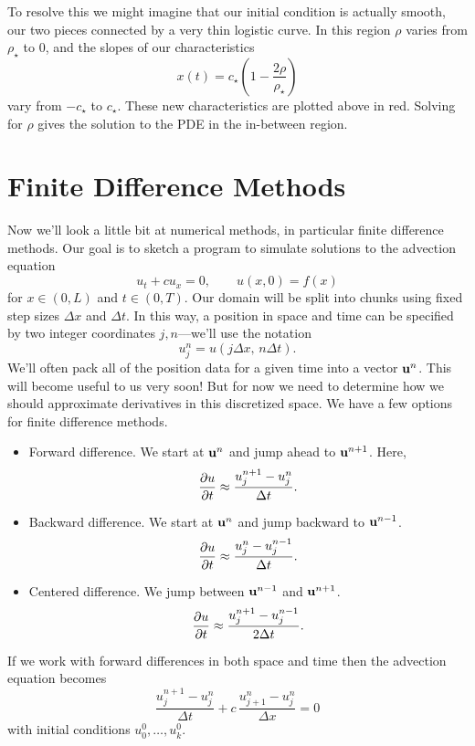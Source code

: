 \documentclass[../m180main.tex]{subfiles}
\begin{document}
To resolve this we might imagine that our initial condition is actually smooth, our two pieces connected by a very thin logistic curve.
In this region $\rho$ varies from $\rho_\star$ to $0$, and the slopes of our characteristics 
\[ x(t) = c_\star \left( 1 - \frac{2\rho}{\rho_\star} \right) \]
vary from $-c_\star$ to $c_\star$.
These new characteristics are plotted above in red.
Solving for $\rho$ gives the solution to the PDE in the in-between region.


\section{Finite Difference Methods}
Now we'll look a little bit at numerical methods, in particular finite difference methods.
Our goal is to sketch a program to simulate solutions to the advection equation
\[ u_t + c u_x = 0, \qquad u(x,0) = f(x) \]
for $x \in (0, L)$ and $t \in (0, T)$.
Our domain will be split into chunks using fixed step sizes $\Delta x$ and $\Delta t$.
In this way, a position in space and time can be specified by two integer coordinates $j,n$---we'll use the notation
\[ u_j^n = u(j \Delta x, \, n \Delta t). \]
We'll often pack all of the position data for a given time into a vector $\mathbf{u}^n$.
This will become useful to us very soon!
But for now we need to determine how we should approximate derivatives in this discretized space.
We have a few options for finite difference methods.
\begin{itemize}
    \item Forward difference.
    We start at $\mathbf{u}^n$ and jump ahead to $\mathbf{u}^{n+1}$.
    Here,
    \[ \frac{\partial u}{\partial t} \approx \frac{u_j^{n+1} - u_j^n}{\Delta t}. \]

    \item Backward difference.
    We start at $\mathbf{u}^n$ and jump backward to $\mathbf{u}^{n-1}$.
    \[ \frac{\partial u}{\partial t} \approx \frac{u_j^n - u_j^{n-1}}{\Delta t}. \]

    \item Centered difference.
    We jump between $\mathbf{u}^{n-1}$ and $\mathbf{u}^{n+1}$.
    \[ \frac{\partial u}{\partial t} \approx \frac{u_j^{n+1} - u_j^{n-1}}{2\Delta t}. \]
\end{itemize}
If we work with forward differences in both space and time then the advection equation becomes
\[ \frac{u_j^{n+1} - u_j^n}{\Delta t} + c \, \frac{u_{j+1}^n - u_j^n}{\Delta x} = 0 \]
with initial conditions $u_0^0, \ldots, u_k^0$.
\end{document}
